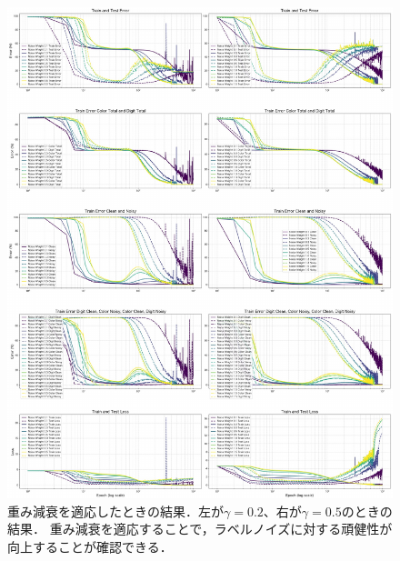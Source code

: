 \begin{figure}[t]
    \centering
    \includegraphics[width=\linewidth]{fig/weight_decay.pdf}
    \caption{重み減衰を適応したときの結果．左が$\gamma=0.2$、右が$\gamma=0.5$のときの結果．
    重み減衰を適応することで，ラベルノイズに対する頑健性が向上することが確認できる．}
    \label{fig:weight_decay}
\end{figure}
